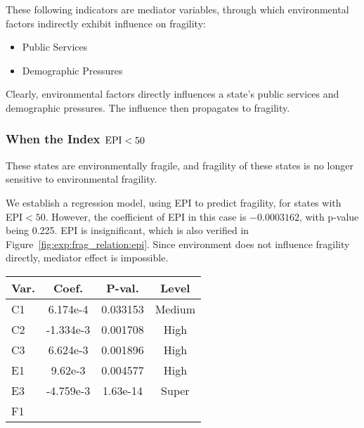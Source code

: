 These following indicators are mediator variables, through which environmental factors indirectly exhibit influence on fragility:
\begin{itemize}
   \item Public Services
   \item Demographic Pressures
\end{itemize}
Clearly, environmental factors directly influences a state's public services and demographic pressures. The influence then propagates to fragility.

\subsubsection{When the Index $\rm{EPI} < 50$}
These states are environmentally fragile, and fragility of these states is no longer sensitive to environmental fragility.

We establish a regression model, using EPI to predict fragility, for states with EPI$<50$. 
However, the coefficient of EPI in this case is $ -0.0003162 $, with p-value being 0.225. EPI is insignificant, which is also verified in Figure~\ref{fig:exp:frag_relation:epi}. Since environment does not influence fragility directly, mediator effect is impossible.

\begin{table}[htbp]
   \begin{tabular}{|l|ccc|}\hline
    Var. & Coef. & P-val. & Level \\ \hline
      C1 & 6.174e-4 & 0.033153 & Medium \\ \hline
      C2 & -1.334e-3 & 0.001708 & High \\ \hline
      C3 & 6.624e-3 & 0.001896 & High \\ \hline
      E1 & 9.62e-3 & 0.004577 & High \\ \hline
      E3 & -4.759e-3 & 1.63e-14 & Super \\ \hline
      F1 &
   \end{tabular}
\end{table}

